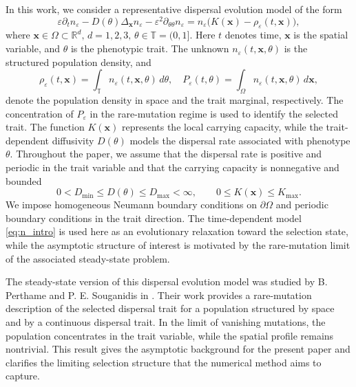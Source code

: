 \documentclass[11pt]{article}
\numberwithin{equation}{section}
\begin{document}
In this work, we consider a representative dispersal evolution model of the form 
\begin{equation}\label{eq:n_intro} 
	\varepsilon \partial_t n_\varepsilon -D(\theta)\Delta_{\mathbf{x}} n_\varepsilon -\varepsilon^2\partial_{\theta\theta} n_\varepsilon = n_\varepsilon\bigl(K(\mathbf{x})-\rho_\varepsilon(t, \mathbf{x})\bigr), 
\end{equation} 
where $\mathbf{x}\in\Omega\subset \mathbb{R}^d, \, d=1,2,3, \, \theta \in \mathbb{T}=(0,1].$
Here \(t\) denotes time, \(\mathbf{x}\) is the spatial variable, and \(\theta\) is the phenotypic trait. The unknown
\(n_\varepsilon(t,\mathbf{x},\theta)\) is the structured population density, and 
\begin{equation} \label{def:rho_P}
	\rho_\varepsilon(t,\mathbf{x}) = \int_{\mathbb T} n_\varepsilon(t,\mathbf{x},\theta)\,d\theta, \quad 
	P_\varepsilon(t,\theta) = \int_\Omega n_\varepsilon(t,\mathbf{x},\theta)\,d\mathbf{x},  
\end{equation}
denote the population density in space and the trait marginal, respectively. 
The concentration of \(P_\varepsilon\) in the rare-mutation regime is used to identify the selected trait. 
The function \(K(\mathbf{x})\) represents the local carrying capacity, while the trait-dependent diffusivity \(D(\theta)\) models the dispersal rate associated with phenotype \(\theta\). Throughout the paper, we assume that the dispersal rate is positive and periodic in the trait variable and that the carrying capacity is nonnegative and bounded \cite{PerthameSouganidis}
 \begin{equation}\label{eq:basic_assumptions} 
 	0<D_{\min}\le D(\theta)\le D_{\max}<\infty, \qquad 0\le K(\mathbf{x})\le K_{\max}. 
\end{equation} 
We impose homogeneous Neumann boundary conditions on \(\partial\Omega\) and periodic boundary conditions in the trait direction. The time-dependent model \eqref{eq:n_intro} is used here as an evolutionary relaxation toward the selection state, while the asymptotic structure of interest is motivated by the rare-mutation limit of the associated steady-state problem.


The steady-state version of this dispersal evolution model was studied by
B. Perthame and P. E. Souganidis in \cite{PerthameSouganidis}.  Their work provides a
rare-mutation description of the selected dispersal trait for a population
structured by space and by a continuous dispersal trait.  In the limit of
vanishing mutations, the population concentrates in the trait variable, while
the spatial profile remains nontrivial.  This result gives the asymptotic
background for the present paper and clarifies the limiting selection structure
that the numerical method aims to capture.
\end{document}
